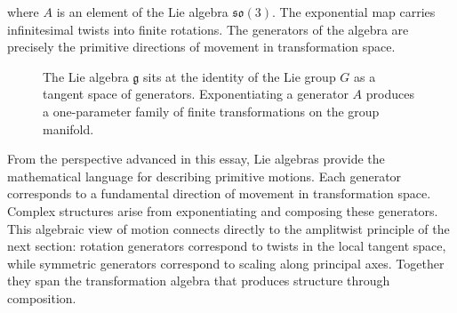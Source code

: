 \documentclass[11pt, a4paper]{article}
\theoremstyle{plain}
\theoremstyle{definition}
\theoremstyle{remark}
\begin{document}
where $A$ is an element of the Lie algebra $\mathfrak{so}(3)$.
The exponential map carries infinitesimal twists into finite rotations.
The generators of the algebra are precisely the primitive directions of movement
in transformation space.

\begin{figure}[h]
\centering
{}
\caption{The Lie algebra $\mathfrak{g}$ sits at the identity of the Lie group $G$
as a tangent space of generators. Exponentiating a generator $A$ produces a
one-parameter family of finite transformations on the group manifold.}
\end{figure}

From the perspective advanced in this essay, Lie algebras provide the mathematical
language for describing primitive motions. Each generator corresponds to a fundamental
direction of movement in transformation space. Complex structures arise from
exponentiating and composing these generators. This algebraic view of motion connects
directly to the amplitwist principle of the next section: rotation generators correspond
to twists in the local tangent space, while symmetric generators correspond to scaling
along principal axes. Together they span the transformation algebra that produces
structure through composition.
\end{document}
